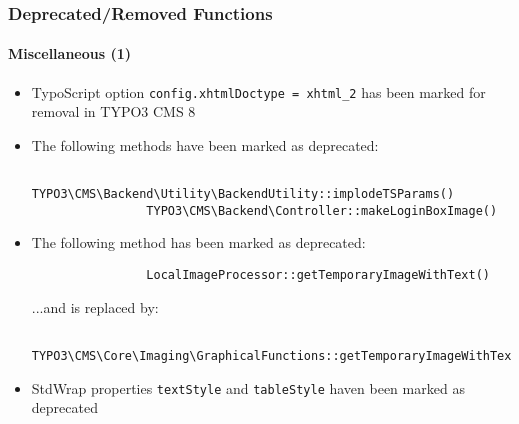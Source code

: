 \begin{frame}[fragile]
	\frametitle{Deprecated/Removed Functions}
	\framesubtitle{Miscellaneous (1)}

	\begin{itemize}
		\item TypoScript option \texttt{config.xhtmlDoctype = xhtml\_2} has been marked for removal in TYPO3 CMS 8

		\item The following methods have been marked as deprecated:
			\begin{lstlisting}
				TYPO3\CMS\Backend\Utility\BackendUtility::implodeTSParams()
				TYPO3\CMS\Backend\Controller::makeLoginBoxImage()
			\end{lstlisting}

		\item The following method has been marked as deprecated:
			\begin{lstlisting}
				LocalImageProcessor::getTemporaryImageWithText()
			\end{lstlisting}

			...and is replaced by:

			\begin{lstlisting}
				TYPO3\CMS\Core\Imaging\GraphicalFunctions::getTemporaryImageWithText()
			\end{lstlisting}

		\item StdWrap properties \texttt{textStyle} and \texttt{tableStyle} haven been marked as deprecated

	\end{itemize}

\end{frame}


